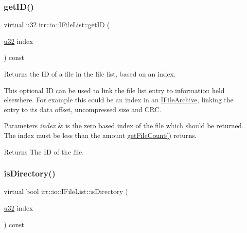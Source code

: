 \subsubsection{\texorpdfstring{get\+I\+D()}{getID()}}
{\footnotesize\ttfamily virtual \hyperlink{namespaceirr_a0416a53257075833e7002efd0a18e804}{u32} irr\+::io\+::\+I\+File\+List\+::get\+ID (\begin{DoxyParamCaption}\item[{\hyperlink{namespaceirr_a0416a53257075833e7002efd0a18e804}{u32}}]{index }\end{DoxyParamCaption}) const\hspace{0.3cm}{\ttfamily [pure virtual]}}



Returns the ID of a file in the file list, based on an index. 

This optional ID can be used to link the file list entry to information held elsewhere. For example this could be an index in an \hyperlink{classirr_1_1io_1_1IFileArchive}{I\+File\+Archive}, linking the entry to its data offset, uncompressed size and C\+RC. 
\begin{DoxyParams}{Parameters}
{\em index} & is the zero based index of the file which should be returned. The index must be less than the amount \hyperlink{classirr_1_1io_1_1IFileList_a871861be76e18d58274c4580b1d103b9}{get\+File\+Count()} returns. \\
\hline
\end{DoxyParams}
\begin{DoxyReturn}{Returns}
The ID of the file. 
\end{DoxyReturn}
\mbox{\label{classirr_1_1io_1_1IFileList_a0f2cb8c99e9ecc4b56d08718c885a5af}} 
\subsubsection{\texorpdfstring{is\+Directory()}{isDirectory()}}
{\footnotesize\ttfamily virtual bool irr\+::io\+::\+I\+File\+List\+::is\+Directory (\begin{DoxyParamCaption}\item[{\hyperlink{namespaceirr_a0416a53257075833e7002efd0a18e804}{u32}}]{index }\end{DoxyParamCaption}) const\hspace{0.3cm}{\ttfamily [pure virtual]}}




